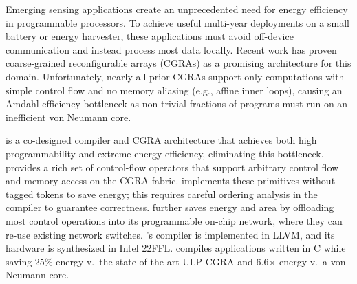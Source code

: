 Emerging sensing applications create an unprecedented need for
energy efficiency in programmable processors.
%
To achieve useful multi-year deployments on a small battery or energy
harvester, these applications must avoid off-device communication
and instead process most data locally.
%
Recent work has proven coarse-grained
reconfigurable arrays (CGRAs) as a promising architecture for this
domain.
%
Unfortunately, nearly all prior CGRAs support only computations with
simple control flow and no memory aliasing (e.g., affine inner loops),
causing an Amdahl efficiency bottleneck as non-trivial fractions of
programs must run on an inefficient von Neumann core.

\riptide is a co-designed compiler and CGRA architecture that
achieves both high programmability and extreme energy efficiency,
eliminating this bottleneck.
%
\riptide provides a rich set of control-flow operators
that support arbitrary control flow and memory access
on the CGRA fabric.
%
\riptide implements these primitives without tagged tokens
to save energy; this requires careful ordering analysis
in the compiler to guarantee correctness.
%
\riptide further saves energy and area by offloading most control
operations into its programmable on-chip network,
where they can re-use existing network switches.
%
\riptide's compiler is implemented in LLVM, and its hardware
is synthesized in Intel 22FFL. %
%
\riptide compiles applications written in C while saving
25\% energy v.\ the state-of-the-art ULP CGRA
and 6.6$\times$ energy v.\ a von Neumann core.

